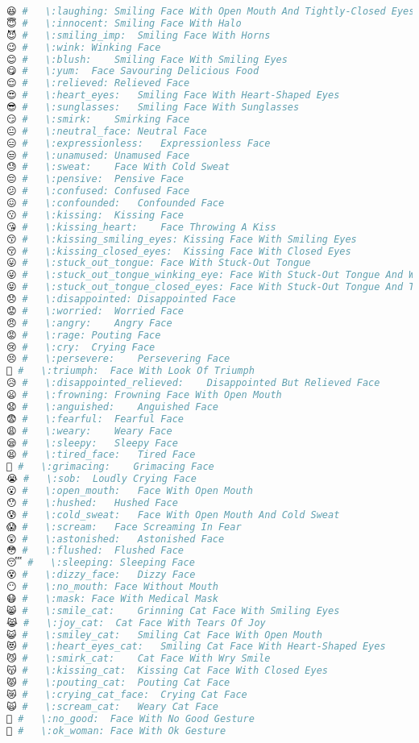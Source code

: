 \begin{lstlisting}[language=Julia, style=julia]
😆 #   \:laughing: Smiling Face With Open Mouth And Tightly-Closed Eyes
😇 #   \:innocent: Smiling Face With Halo
😈 #   \:smiling_imp:  Smiling Face With Horns
😉 #   \:wink: Winking Face
😊 #   \:blush:    Smiling Face With Smiling Eyes
😋 #   \:yum:  Face Savouring Delicious Food
😌 #   \:relieved: Relieved Face
😍 #   \:heart_eyes:   Smiling Face With Heart-Shaped Eyes
😎 #   \:sunglasses:   Smiling Face With Sunglasses
😏 #   \:smirk:    Smirking Face
😐 #   \:neutral_face: Neutral Face
😑 #   \:expressionless:   Expressionless Face
😒 #   \:unamused: Unamused Face
😓 #   \:sweat:    Face With Cold Sweat
😔 #   \:pensive:  Pensive Face
😕 #   \:confused: Confused Face
😖 #   \:confounded:   Confounded Face
😗 #   \:kissing:  Kissing Face
😘 #   \:kissing_heart:    Face Throwing A Kiss
😙 #   \:kissing_smiling_eyes: Kissing Face With Smiling Eyes
😚 #   \:kissing_closed_eyes:  Kissing Face With Closed Eyes
😛 #   \:stuck_out_tongue: Face With Stuck-Out Tongue
😜 #   \:stuck_out_tongue_winking_eye: Face With Stuck-Out Tongue And Winking Eye
😝 #   \:stuck_out_tongue_closed_eyes: Face With Stuck-Out Tongue And Tightly-Closed Eyes
😞 #   \:disappointed: Disappointed Face
😟 #   \:worried:  Worried Face
😠 #   \:angry:    Angry Face
😡 #   \:rage: Pouting Face
😢 #   \:cry:  Crying Face
😣 #   \:persevere:    Persevering Face
😤 #   \:triumph:  Face With Look Of Triumph
😥 #   \:disappointed_relieved:    Disappointed But Relieved Face
😦 #   \:frowning: Frowning Face With Open Mouth
😧 #   \:anguished:    Anguished Face
😨 #   \:fearful:  Fearful Face
😩 #   \:weary:    Weary Face
😪 #   \:sleepy:   Sleepy Face
😫 #   \:tired_face:   Tired Face
😬 #   \:grimacing:    Grimacing Face
😭 #   \:sob:  Loudly Crying Face
😮 #   \:open_mouth:   Face With Open Mouth
😯 #   \:hushed:   Hushed Face
😰 #   \:cold_sweat:   Face With Open Mouth And Cold Sweat
😱 #   \:scream:   Face Screaming In Fear
😲 #   \:astonished:   Astonished Face
😳 #   \:flushed:  Flushed Face
😴 #   \:sleeping: Sleeping Face
😵 #   \:dizzy_face:   Dizzy Face
😶 #   \:no_mouth: Face Without Mouth
😷 #   \:mask: Face With Medical Mask
😸 #   \:smile_cat:    Grinning Cat Face With Smiling Eyes
😹 #   \:joy_cat:  Cat Face With Tears Of Joy
😺 #   \:smiley_cat:   Smiling Cat Face With Open Mouth
😻 #   \:heart_eyes_cat:   Smiling Cat Face With Heart-Shaped Eyes
😼 #   \:smirk_cat:    Cat Face With Wry Smile
😽 #   \:kissing_cat:  Kissing Cat Face With Closed Eyes
😾 #   \:pouting_cat:  Pouting Cat Face
😿 #   \:crying_cat_face:  Crying Cat Face
🙀 #   \:scream_cat:   Weary Cat Face
🙅 #   \:no_good:  Face With No Good Gesture
🙆 #   \:ok_woman: Face With Ok Gesture

\end{lstlisting}
